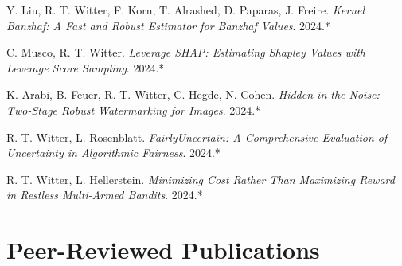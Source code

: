 \documentclass[11pt,a4paper,sans]{moderncv}
\begin{document}
\begin{enumerate}[label={[\arabic*]},align=left]
    \item Y. Liu, R. T. Witter, F. Korn, T. Alrashed, D. Paparas, J. Freire. \textit{Kernel Banzhaf: A Fast and Robust Estimator for Banzhaf Values}. 2024.*
    \item C. Musco, R. T. Witter. \textit{Leverage SHAP: Estimating Shapley Values with Leverage Score Sampling}. 2024.*
    \item K. Arabi, B. Feuer, R. T. Witter, C. Hegde, N. Cohen. \textit{Hidden in the Noise: Two-Stage Robust Watermarking for Images}. 2024.*
    \item R. T. Witter, L. Rosenblatt. \textit{FairlyUncertain: A Comprehensive Evaluation of Uncertainty in Algorithmic Fairness}. 2024.*
    \item R. T. Witter, L. Hellerstein. \textit{Minimizing Cost Rather Than Maximizing Reward in Restless Multi-Armed Bandits}. 2024.*
\end{enumerate}


\section{Peer-Reviewed Publications}
\end{document}
